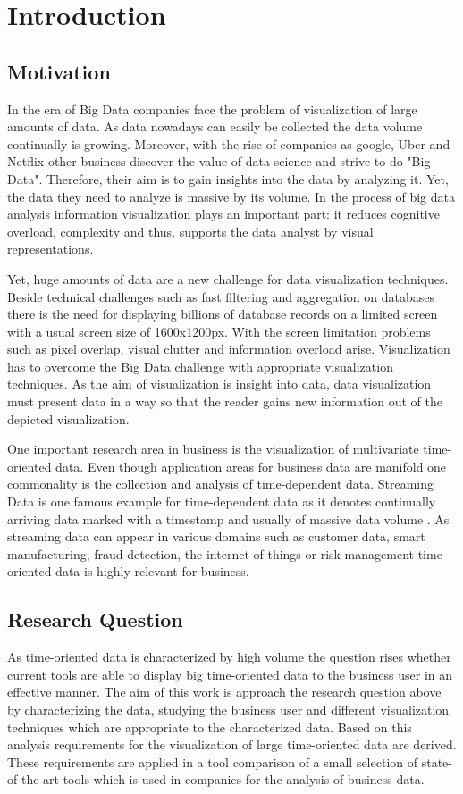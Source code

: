 \chapter{Introduction}
\label{chap:introduction}

\section{Motivation}
In the era of Big Data companies face the problem of visualization of large amounts of data. As data nowadays can easily be collected the data volume continually is growing. Moreover, with the rise of companies as google, Uber and Netflix other business discover the value of data science and strive to do "Big Data". Therefore, their aim is to gain insights into the data by analyzing it. Yet, the data they need to analyze is massive by its volume. In the process of big data analysis information visualization plays an important part: it reduces cognitive overload, complexity and thus, supports the data analyst by visual representations.
\par
Yet, huge amounts of data are a new challenge for data visualization techniques. Beside technical challenges such as fast filtering and aggregation on databases there is the need for displaying billions of database records on a limited screen with a usual screen size of 1600x1200px. With the screen limitation problems such as pixel overlap, visual clutter and information overload arise. Visualization has to overcome the Big Data challenge with appropriate visualization techniques.
As the aim of visualization is insight into data, data visualization must present data in a way so that the reader gains new information out of the depicted visualization.
\par
One important research area in business is the visualization of multivariate time-oriented data. Even though application areas for business data are manifold one commonality is the collection and analysis of time-dependent data. Streaming Data is one famous example for time-dependent data as it denotes continually arriving data marked with a timestamp and usually of massive data volume \cite{o2002streaming} . As streaming data can appear in various domains such as customer data, smart manufacturing, fraud detection, the internet of things or risk management time-oriented data is highly relevant for business.

\section{Research Question}
As time-oriented data is characterized by high volume the question rises whether current tools are able to display big time-oriented data to the business user in an effective manner. The aim of this work is approach the research question above by characterizing the data, studying the business user and different visualization techniques which are appropriate to the characterized data. Based on this analysis requirements for the visualization of large time-oriented data are derived. These requirements are applied in a tool comparison of a small selection of state-of-the-art tools which is used in companies for the analysis of business data.


